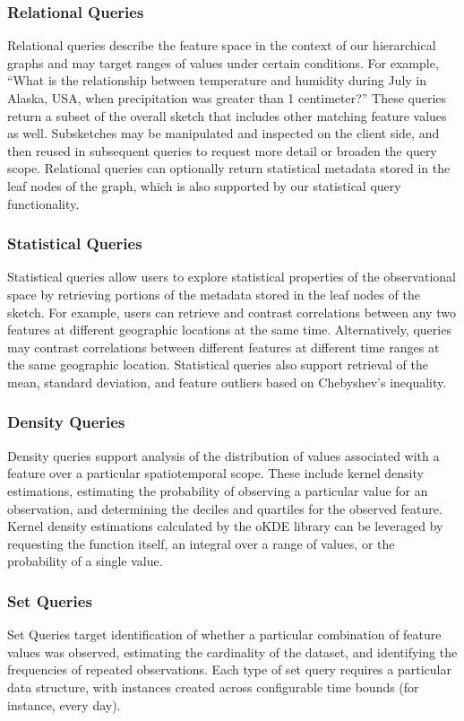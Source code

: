 \subsubsection{Relational Queries}
Relational queries describe the feature space in the context of our hierarchical graphs and may target ranges of values under certain conditions. For example, ``What is the relationship between temperature and humidity during July in Alaska, USA, when precipitation was greater than 1 centimeter?'' These queries return a subset of the overall sketch that includes other matching feature values as well. Subsketches may be manipulated and inspected on the client side, and then reused in subsequent queries to request more detail or broaden the query scope. Relational queries can optionally return statistical metadata stored in the leaf nodes of the graph, which is also supported by our statistical query functionality.

\subsubsection{Statistical Queries}
Statistical queries allow users to explore statistical properties of the observational space by retrieving portions of the metadata stored in the leaf nodes of the sketch. For example, users can retrieve and contrast correlations between any two features at different geographic locations at the same time. Alternatively, queries may contrast correlations between different features at different time ranges at the same geographic location. Statistical queries also support retrieval of the mean, standard deviation, and feature outliers based on Chebyshev's inequality.

\subsubsection{Density Queries}
Density queries support analysis of the distribution of values associated with a feature over a particular spatiotemporal scope. These include kernel density estimations, estimating the probability of observing a particular value for an observation, and determining the deciles and quartiles for the observed feature. Kernel density estimations calculated by the oKDE library can be leveraged by requesting the function itself, an integral over a range of values, or the probability of a single value.

\subsubsection{Set Queries}
Set Queries target identification of whether a particular combination of feature values was observed, estimating the cardinality of the dataset, and identifying the frequencies of repeated observations. Each type of set query requires a particular data structure, with instances created across configurable time bounds (for instance, every day).

